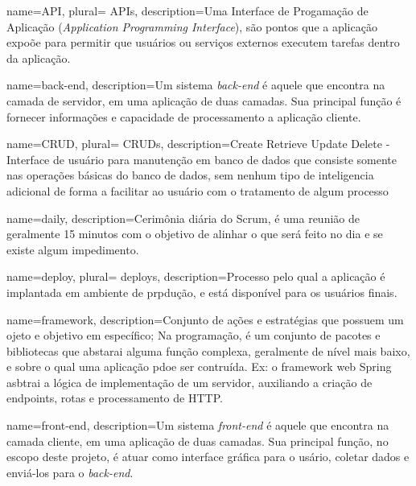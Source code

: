


 {
    name=API,
    plural= {APIs},
    description={Uma Interface de Progamação de Aplicação (\emph{Application Programming Interface}), são pontos que a
    aplicação expoõe para permitir que usuários ou serviços externos
    executem tarefas dentro da aplicação.}
}

 {
    name={back-end},
    description={Um sistema \emph{back-end} é aquele que encontra na
    camada de servidor, em uma aplicação de duas camadas. Sua
    principal função é fornecer informações e capacidade de
    processamento a aplicação cliente.}
}

 {
    name=CRUD,
    plural= {CRUDs},
    description={Create Retrieve Update Delete - Interface de usuário para manutenção em banco de dados que consiste somente nas operações básicas do banco de dados, sem nenhum tipo de inteligencia adicional de forma a facilitar ao usuário com o tratamento de algum processo}
}

 {
    name=daily,
    description={Cerimônia diária do Scrum, é uma reunião de geralmente 15 minutos com o objetivo de alinhar o que será feito no dia e se existe algum impedimento.}
}

 {
    name=deploy,
    plural= {deploys},
    description={Processo pelo qual a aplicação é implantada em ambiente
  de prpdução, e está disponível para os usuários finais.}
}

 {
    name=framework,
    description={Conjunto de ações e estratégias que possuem um ojeto e objetivo em específico;
    Na programação, é um conjunto de pacotes e bibliotecas que abstarai
    alguma função complexa, geralmente de nível mais baixo, e sobre o
    qual uma aplicação pdoe ser contruída. Ex: o framework web Spring
    asbtrai a lógica de implementação de um servidor, auxiliando a
    criação de endpoints, rotas e processamento de HTTP.}
}

 {
    name={front-end},
    description={Um sistema \emph{front-end} é aquele que encontra na
    camada cliente, em uma aplicação de duas camadas. Sua
    principal função, no escopo deste projeto, é atuar como interface
    gráfica para o usário, coletar dados e enviá-los para o \emph{back-end}.}
}

